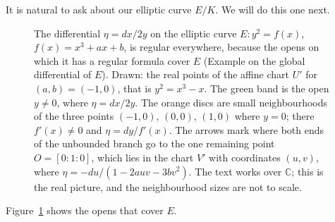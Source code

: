 \documentclass[12pt]{article}
\numberwithin{equation}{section}
\theoremstyle{definition}
\theoremstyle{remark}
\newcommand{\CC}{\mathbb{C}}
\begin{document}
It is natural to ask about our elliptic curve $E/K$.
We will do this one next.
\begin{figure}[H]
\centering

\caption{The differential $\eta=dx/2y$ on the elliptic curve $E\colon y^2=f(x)$, $f(x)=x^3+ax+b$, is regular everywhere, because the opens on which it has a regular formula cover $E$ (Example on the global differential of $E$). Drawn: the real points of the affine chart $U'$ for $(a,b)=(-1,0)$, that is $y^2=x^3-x$. The green band is the open $y\neq0$, where $\eta=dx/2y$. The orange discs are small neighbourhoods of the three points $(-1,0)$, $(0,0)$, $(1,0)$ where $y=0$; there $f'(x)\neq0$ and $\eta=dy/f'(x)$. The arrows mark where both ends of the unbounded branch go to the one remaining point $O=[0{:}1{:}0]$, which lies in the chart $V'$ with coordinates $(u,v)$, where $\eta=-du/(1-2auv-3bv^2)$. The text works over $\CC$; this is the real picture, and the neighbourhood sizes are not to scale.}\label{fig:eta-regular}
\end{figure}
Figure~\ref{fig:eta-regular} shows the opens that cover $E$.
\end{document}
